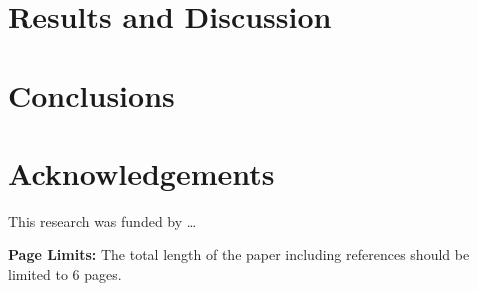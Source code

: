 \documentclass[12pt]{ussci}
\begin{document}
\section{Results and Discussion}
%
\blindtext


\section{Conclusions}
%
\blindtext

\blindtext

\section{Acknowledgements}
This research was funded by \ldots

\noindent\textbf{Page Limits:} The total length of the paper including references should be limited to 6 pages.

\printbibliography[heading=bibintoc]
\end{document}
